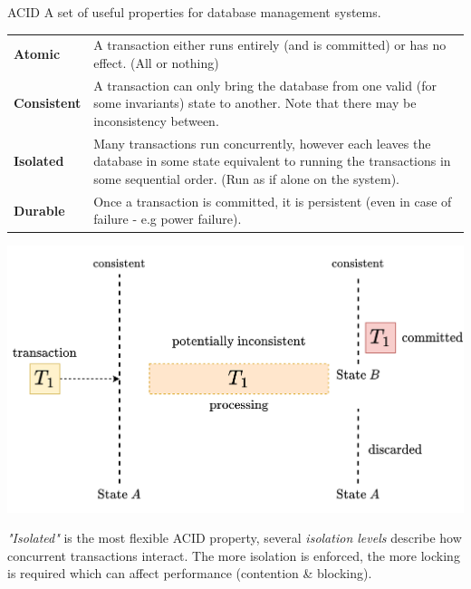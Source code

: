 \begin{definitionbox}{ACID}
    A set of useful properties for database management systems.
    \begin{center}
        \begin{tabular}{l p{}}
            \textbf{Atomic} & A transaction either runs entirely (and is committed) or has no effect. (All or nothing) \\
            \textbf{Consistent} & A transaction can only bring the database from one valid (for some invariants) state to another. Note that there may be inconsistency between. \\
            \textbf{Isolated} & Many transactions run concurrently, however each leaves the database in some state equivalent to running the transactions in some sequential order. (Run as if alone on the system). \\
            \textbf{Durable} & Once a transaction is committed, it is persistent (even in case of failure - e.g power failure). \\
        \end{tabular}
    \end{center}
\end{definitionbox}
\begin{center}
    \includegraphics[width=.7\textwidth]{introduction/images/consistent_state.drawio.png}
\end{center}
\noindent
\textit{"Isolated"} is the most flexible ACID property, several \textit{isolation levels} describe how concurrent transactions interact. 
The more isolation is enforced, the more locking is required which can affect performance (contention \& blocking).

